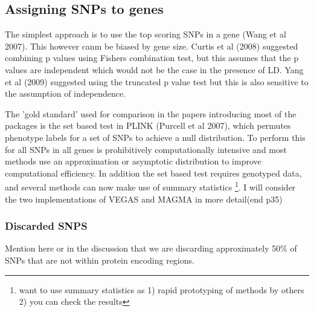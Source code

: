 \subsection{Assigning SNPs to genes}

The simplest approach is to use the top scoring SNPs in a gene (Wang et al 2007). This however canm be biased by gene size. Curtis et al (2008) suggested combining p values using Fishers combination test, but this assumes that the p values are independent which would not be the case in the presence of LD. Yang et al (2009)
suggested using the truncated p value test but this is also sensitive to the assumption of independence. 

The 'gold standard' used for comparison in the papers introducing most of the packages is the set based test in PLINK (Purcell et al 2007), which permutes phenotype labels for a set of SNPs to achieve a null distribution. To perform this for all SNPs in all genes is prohibitively computationally intensive and most methods use an approximation or asymptotic distribution to improve computational efficiency. In addition the set based test requires genotyped data, and several methods can now make use of summary statistics \footnote{want to use summary statistics as 1) rapid prototyping of methods by others 2) you can check the results}. I will consider the two implementations of VEGAS and MAGMA in more detail(end p35)

\subsubsection{Discarded SNPS}
Mention here or in the discussion that we are discarding approximately 50\% of SNPs that are not within protein encoding regions. 

